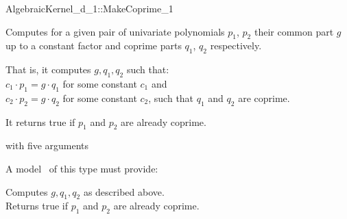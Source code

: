 \begin{ccRefFunctionObjectConcept}{AlgebraicKernel_d_1::MakeCoprime_1}

\ccDefinition
Computes for a given pair of univariate polynomials $p_1$, $p_2$ their
common part $g$ up to a constant factor and coprime parts $q_1$, $q_2$ 
respectively. 

That is, it computes $g, q_1, q_2$ such that:\\
\hspace{1cm} $c_1 \cdot p_1 =  g \cdot q_1$ for some constant $c_1$ and\\
\hspace{1cm} $c_2 \cdot p_2 =  g \cdot q_2$ for some constant $c_2$, 
such that $q_1$ and $q_2$ are coprime. 


It returns true if $p_1$ and $p_2$ are already coprime.

\ccRefines 
{} with five arguments 

\ccTypes
{}

\ccOperations
{}
A model \ccVar\ of this type must provide:

{ Computes $g, q_1, q_2$ as described above.\\
Returns true if $p_1$ and $p_2$ are already coprime. 
}

\ccSeeAlso
{}\\

\end{ccRefFunctionObjectConcept}
